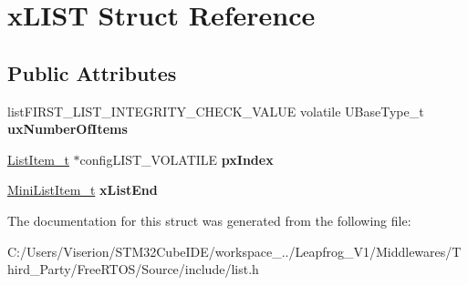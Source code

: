 \hypertarget{structx_l_i_s_t}{}\section{x\+L\+I\+ST Struct Reference}
\label{structx_l_i_s_t}
\subsection*{Public Attributes}
\begin{DoxyCompactItemize}
\item 
\mbox{\label{structx_l_i_s_t_aa280e17bf4e71f81c449c2444cb70378}} 
list\+F\+I\+R\+S\+T\+\_\+\+L\+I\+S\+T\+\_\+\+I\+N\+T\+E\+G\+R\+I\+T\+Y\+\_\+\+C\+H\+E\+C\+K\+\_\+\+V\+A\+L\+UE volatile U\+Base\+Type\+\_\+t {\bfseries ux\+Number\+Of\+Items}
\item 
\mbox{\label{structx_l_i_s_t_a7bf64d87701493b4c8c5c977682500d7}} 
\mbox{\hyperlink{structx_l_i_s_t___i_t_e_m}{List\+Item\+\_\+t}} $\ast$config\+L\+I\+S\+T\+\_\+\+V\+O\+L\+A\+T\+I\+LE {\bfseries px\+Index}
\item 
\mbox{\label{structx_l_i_s_t_a49ad62fa153126e27e273811167b336a}} 
\mbox{\hyperlink{structx_m_i_n_i___l_i_s_t___i_t_e_m}{Mini\+List\+Item\+\_\+t}} {\bfseries x\+List\+End}
\end{DoxyCompactItemize}


The documentation for this struct was generated from the following file\+:\begin{DoxyCompactItemize}
\item 
C\+:/\+Users/\+Viserion/\+S\+T\+M32\+Cube\+I\+D\+E/workspace\+\_../\+Leapfrog\+\_\+\+V1/\+Middlewares/\+Third\+\_\+\+Party/\+Free\+R\+T\+O\+S/\+Source/include/list.\+h\end{DoxyCompactItemize}
